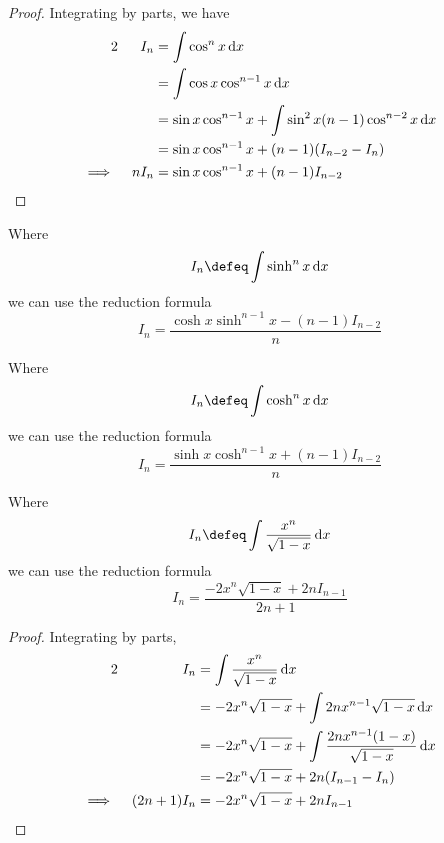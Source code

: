 \begin{proof}
 Integrating by parts, we have
 \begin{alignat*}2
  && I_n &= \integ{\cos^n x}{x} \\
  &&     &= \integ{\cos x \cos^{n - 1}x}{x} \\
  &&     &= \sin x \cos^{n - 1} x +
             \integ{\sin^2 x (n - 1) \cos^{n - 2} x}{x} \\
  &&     &= \sin x \cos^{n - 1} x + (n - 1)(I_{n - 2} - I_n) \\
  \implies{}&& n I_n &= \sin x \cos^{n - 1} x + (n - 1)I_{n - 2} \qedhere
 \end{alignat*}
\end{proof}
\begin{theorem}
 Where
 \begin{equation*}
  I_n \defeq \integ{\sinh^n x}{x}
 \end{equation*}
 we can use the reduction formula
 \begin{equation*}
  I_n = \frac{\cosh x \sinh^{n - 1}x - (n - 1)I_{n - 2}} n
 \end{equation*}
\end{theorem}
\begin{theorem}
 Where
 \begin{equation*}
  I_n \defeq \integ{\cosh^n x}{x}
 \end{equation*}
 we can use the reduction formula
 \begin{equation*}
  I_n = \frac{\sinh x \cosh^{n - 1}x + (n - 1)I_{n - 2}} n
 \end{equation*}
\end{theorem}
\begin{theorem}
 Where
 \begin{equation*}
  I_n \defeq \integ{\frac{x^n}{\sqrt{1 - x}}}{x}
 \end{equation*}
 we can use the reduction formula
 \begin{equation*}
  I_n = \frac{-2x^n \sqrt{1 - x} + 2n I_{n - 1}}{2n + 1}
 \end{equation*}
\end{theorem}
\begin{proof}
 Integrating by parts,
 \begin{alignat*}2
  && I_n &= \integ{\frac{x^n}{\sqrt{1 - x}}}{x} \\
  &&     &= -2x^n \sqrt{1 - x} + \integ{2n x^{n - 1} \sqrt{1 - x}}{x} \\
  &&     &= -2x^n \sqrt{1 - x} + \integ{\frac{2n x^{n - 1}(1 - x)}
                                             {\sqrt{1 - x}}}{x} \\
  &&     &= -2x^n \sqrt{1 - x} + 2n (I_{n - 1} - I_n) \\
  \implies{}&& (2n + 1)I_n &= -2x^n \sqrt{1 - x} + 2n I_{n - 1} \qedhere
 \end{alignat*}
\end{proof}
